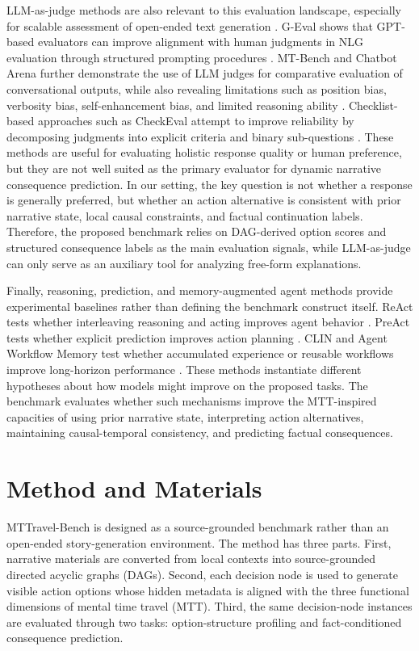 \documentclass[pdflatex,sn-mathphys-num]{sn-jnl}%
\theoremstyle{thmstyleone}%
\theoremstyle{thmstyletwo}%
\theoremstyle{thmstylethree}%
\begin{document}
LLM-as-judge methods are also relevant to this evaluation landscape, especially for scalable assessment of open-ended text generation \cite{zheng2023judging}. G-Eval shows that GPT-based evaluators can improve alignment with human judgments in NLG evaluation through structured prompting procedures \cite{liu2023geval}. MT-Bench and Chatbot Arena further demonstrate the use of LLM judges for comparative evaluation of conversational outputs, while also revealing limitations such as position bias, verbosity bias, self-enhancement bias, and limited reasoning ability \cite{zheng2023judging}. Checklist-based approaches such as CheckEval attempt to improve reliability by decomposing judgments into explicit criteria and binary sub-questions \cite{lee2025checkeval}. These methods are useful for evaluating holistic response quality or human preference, but they are not well suited as the primary evaluator for dynamic narrative consequence prediction. In our setting, the key question is not whether a response is generally preferred, but whether an action alternative is consistent with prior narrative state, local causal constraints, and factual continuation labels. Therefore, the proposed benchmark relies on DAG-derived option scores and structured consequence labels as the main evaluation signals, while LLM-as-judge can only serve as an auxiliary tool for analyzing free-form explanations.

Finally, reasoning, prediction, and memory-augmented agent methods provide experimental baselines rather than defining the benchmark construct itself. ReAct tests whether interleaving reasoning and acting improves agent behavior \cite{yao2022react}. PreAct tests whether explicit prediction improves action planning \cite{fu2025preact}. CLIN and Agent Workflow Memory test whether accumulated experience or reusable workflows improve long-horizon performance \cite{majumder2023clin,wang2024agent}. These methods instantiate different hypotheses about how models might improve on the proposed tasks. The benchmark evaluates whether such mechanisms improve the MTT-inspired capacities of using prior narrative state, interpreting action alternatives, maintaining causal-temporal consistency, and predicting factual consequences.
\section{Method and Materials}\label{sec3}
MTTravel-Bench is designed as a source-grounded benchmark rather than an open-ended story-generation environment. The method has three parts. First, narrative materials are converted from local contexts into source-grounded directed acyclic graphs (DAGs). Second, each decision node is used to generate visible action options whose hidden metadata is aligned with the three functional dimensions of mental time travel (MTT). Third, the same decision-node instances are evaluated through two tasks: option-structure profiling and fact-conditioned consequence prediction.
\end{document}
